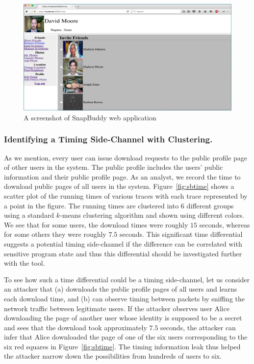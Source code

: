 \documentclass{article}
\begin{document}
\begin{figure}[t]
    \centering
    \includegraphics[width=1\textwidth]{snapbuddy-1}
    \caption{A screenshot of SnapBuddy web application}
    \label{snapbuddy-1}
\end{figure}

\subsubsection*{Identifying a Timing Side-Channel with Clustering.}
As we mention, every user can issue download requests to the
public profile page of other users in the system. The public profile
includes the users' public information and their public profile page. 
As an analyst, we record the time to download public pages of all users
in the system. Figure~\ref{fig:sbtime} shows a scatter plot of the running times of
various traces with each trace represented by a point in the figure. The
running times are clustered into $6$ different groups using a
standard $k$-means clustering algorithm and shown using different
colors. We see that for some users, the download times were roughly $15$ seconds, whereas for
some others they were roughly $7.5$ seconds. This significant time differential suggests a
potential timing side-channel if the difference can be correlated with sensitive
program state and thus this differential should be investigated further with the tool.

To see how such a time differential could be a timing side-channel,
let us consider an attacker that
(a) downloads the public profile pages of all users and learns each download time,
and (b) can observe timing between packets by sniffing the
network traffic between legitimate users.
If the attacker observes user Alice downloading the page of another user whose identity
is supposed to be a secret
and sees that the download took approximately $7.5$ seconds, the attacker can infer
that Alice downloaded the page of one of the six users corresponding
to the six red squares in Figure~\ref{fig:sbtime}. The timing
information leak thus helped the attacker narrow down the
possibilities from hundreds of users to six.
\end{document}

